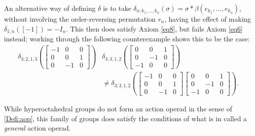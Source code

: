 \begin{nonex}
An alternative way of defining $\delta$ is to take $\delta_{n;k_1,\ldots,k_n}(\sigma) = \sigma \ast \beta(e_{k_1},\ldots,e_{k_n})$, without involving the order-reversing permutation $r_n$, having the effect of making $\delta_{1;n}([-1]) = -I_n$. This then does satisfy Axiom \eqref{eq8}, but fails Axiom \eqref{eq6} instead; working through the following counterexample shows this to be the case:
  \begin{align*}
    \delta_{3;2,1,3}\left(
    \begin{bmatrix}
    -1 & 0 & 0 \\
    0 & 0 & 1 \\
    0 & -1 & 0
    \end{bmatrix}
    \right)
    &\delta_{3;3,1,2}\left(
    \begin{bmatrix}
    0 & 0 & 1 \\
    0 & -1 & 0 \\
    -1 & 0 & 0
    \end{bmatrix}
    \right)\\
    &\neq
    \delta_{3;3,1,2}\left(
    \begin{bmatrix}
    -1 & 0 & 0 \\
    0 & 0 & 1 \\
    0 & -1 & 0
    \end{bmatrix}
    \begin{bmatrix}
    0 & 0 & 1 \\
    0 & -1 & 0 \\
    -1 & 0 & 0
    \end{bmatrix}
    \right).
  \end{align*}

While hyperoctahedral groups do not form an action operad in the sense of \cref{Defi:aop}, this family of groups does satisfy the conditions of what is in \cite[Section 3.2]{accg-actionclones} called a \emph{general} action operad. 
\end{nonex}


